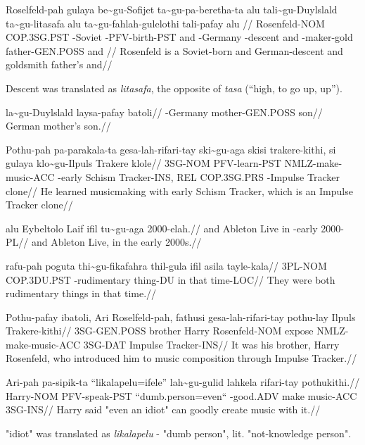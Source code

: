 \ex
\begingl
\gla  Roselfeld-pah gulaya      be\~{}gu-Sofijet ta\~{}gu-pa-beretha-ta alu tali\~{}gu-Duylslald ta\~{}gu-litasafa alu ta\~{}gu-fahlah-gulelothi tali-pafay      alu //
\glb  Rosenfeld-NOM COP.3SG.PST \agradj{}-Soviet \agradj{}-PFV-birth-PST and \agradj{}-Germany   \agradj{}-descent and \agradj{}-maker-gold      father-GEN.POSS and //
\glft Rosenfeld is a Soviet-born and German-descent and goldsmith father's and//
\endgl 
\xe


Descent was translated as \textit{litasafa}, the opposite of \textit{tasa} (``high, to go up, up'').

\ex
\begingl
\gla  la\~{}gu-Duylslald laysa-pafay batoli//
\glb  \agradj{}-Germany  mother-GEN.POSS son//
\glft German mother's son.//
\endgl
\xe

\ex
\begingl
\gla  Pothu-pah pa-parakala-ta gesa-lah-rifari-tay   ski\~{}gu-aga   skisi  trakere-kithi, si  gulaya      klo\~{}gu-Ilpuls  Trakere klole//
\glb  3SG-NOM   PFV-learn-PST  NMLZ-make-music-ACC \agradj{}-early Schism Tracker-INS,   REL COP.3SG.PRS \agradj{}-Impulse Tracker clone//
\glft He learned musicmaking with early Schism Tracker, which is an Impulse Tracker clone//
\endgl
\xe

\ex
\begingl
\gla  alu Eybeltolo Laif ifil tu\~{}gu-aga    2000-elah.//
\glb  and Ableton   Live in   \agradj{}-early 2000-PL//
\glft and Ableton Live, in the early 2000s.//
\endgl
\xe

\ex
\begingl
\gla  rafu-pah poguta      thi\~{}gu-fikafahra   thil-gula ifil asila tayle-kala//
\glb  3PL-NOM  COP.3DU.PST \agradj{}-rudimentary thing-DU  in   that  time-LOC//
\glft They were both rudimentary things in that time.//
\endgl
\xe

\ex
\begingl
\gla  Pothu-pafay  ibatoli, Ari   Roselfeld-pah, fathusi gesa-lah-rifari-tay   pothu-lay Ilpuls  Trakere-kithi//
\glb  3SG-GEN.POSS brother  Harry Rosenfeld-NOM  expose  NMLZ-make-music-ACC 3SG-DAT   Impulse Tracker-INS//
\glft It was his brother, Harry Rosenfeld, who introduced him to music composition through Impulse Tracker.//
\endgl
\xe

\ex
\begingl
\gla  Ari-pah   pa-sipik-ta   ``likalapelu=ifele'' lah\~{}gu-gulid    lahkela rifari-tay pothukithi.//
\glb  Harry-NOM PFV-speak-PST ``dumb.person=even`` \agradj{}-good.ADV make    music-ACC  3SG-INS//
\glft Harry said "even an idiot" can goodly create music with it.//
\endgl
\xe

"idiot" was translated as \textit{likalapelu} - "dumb person", lit. "not-knowledge person".


